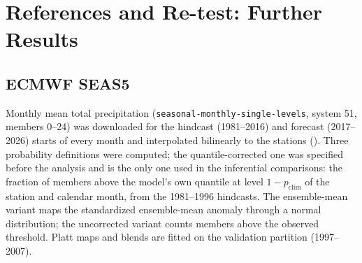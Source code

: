 \documentclass[11pt,a4paper]{article}
\begin{document}
\begin{table}[htbp]
\centering
\caption{Finite-shot inference of \texttt{LSTM+QNN} (15 seeds, 50 repetitions per budget). Loss: exact minus finite-shot 15-seed mean AUC; worst seed: largest loss of one seed's mean over repetitions; shot SD of one model and of the seed mean.}
\label{tab:shots}
{\small
{}}
\end{table}

\section{References and Re-test: Further Results}

\subsection{ECMWF SEAS5}
\label{app:seas5}

Monthly mean total precipitation (\texttt{seasonal-monthly-single-levels}, system 51, members 0--24) was downloaded for the hindcast (1981--2016) and forecast (2017--2026) starts of every month and interpolated bilinearly to the stations (). Three probability definitions were computed; the quantile-corrected one was specified before the analysis and is the only one used in the inferential comparisons: the fraction of members above the model's own quantile at level $1-p_{\text{clim}}$ of the station and calendar month, from the 1981--1996 hindcasts. The ensemble-mean variant maps the standardized ensemble-mean anomaly through a normal distribution; the uncorrected variant counts members above the observed threshold. Platt maps and blends are fitted on the validation partition (1997--2007).
\end{document}
